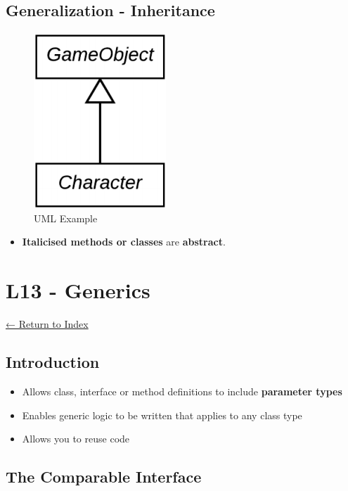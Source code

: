 \documentclass[]{article}
\providecommand{\tightlist}{%
  \setlength{\itemsep}{0pt}\setlength{\parskip}{0pt}}
\begin{document}
\hypertarget{generalization---inheritance}{%
\subsection{Generalization -
Inheritance}\label{generalization---inheritance}}

\begin{figure}
\centering
\includegraphics{images/uml9.png}
\caption{UML Example}
\end{figure}

\begin{itemize}
\tightlist
\item
  \textbf{Italicised methods or classes} are \textbf{abstract}.
\end{itemize}

\hypertarget{l13---generics}{%
\section{L13 - Generics}\label{l13---generics}}

\protect\hyperlink{table-of-contents}{← Return to Index}

\hypertarget{introduction}{%
\subsection{Introduction}\label{introduction}}

\begin{itemize}
\tightlist
\item
  Allows class, interface or method definitions to include
  \textbf{parameter types}
\item
  Enables generic logic to be written that applies to any class type
\item
  Allows you to reuse code
\end{itemize}

\hypertarget{the-comparable-interface}{%
\subsection{The Comparable Interface}\label{the-comparable-interface}}
\end{document}
